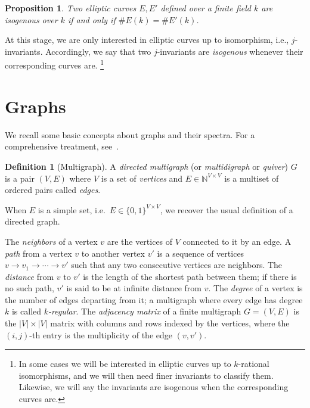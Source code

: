 \documentclass[10pt]{article}
\theoremstyle{plain}
\newtheorem{proposition}[theorem]{Proposition}
\theoremstyle{definition}
\newtheorem{definition}[theorem]{Definition}
\begin{document}
\begin{proposition}
  \label{coro:serre-tate}
  Two elliptic curves $E,E'$ defined over a finite field $k$ are
  isogenous over $k$ if and only if $\#E(k)=\#E'(k)$.
\end{proposition}

At this stage, we are only interested in elliptic curves up to
isomorphism, i.e., $j$-invariants. %
Accordingly, we say that two $j$-invariants are \emph{isogenous}
whenever their corresponding curves are.%
\footnote{In some cases we will be interested in elliptic curves up to
  $k$-rational isomorphisms, and we will then need finer invariants to
  classify them. %
  Likewise, we will say the invariants are isogenous when the
  corresponding curves are.}


\section{Graphs}
\label{sec:graphs}

We recall some basic concepts about graphs and their spectra. %
For a comprehensive treatment,
see~\cite{trevisan-graphs,tao2011expander,Goldreich2011}.

\begin{definition}[Multigraph]
  A \emph{directed multigraph} (or \emph{multidigraph} or \emph{quiver})
  $G$ is a pair $(V,E)$ where $V$ is a set of \emph{vertices} and
  $E∈ℕ^{V×V}$ is a multiset of ordered pairs called \emph{edges}.   
\end{definition}

When $E$ is a simple set, i.e.\ $E∈\{0,1\}^{V×V}$, we recover the
usual definition of a directed graph. %

The \emph{neighbors} of a vertex $v$ are the vertices of $V$ connected
to it by an edge. %
A \emph{path} from a vertex $v$ to another vertex $v'$ is a sequence
of vertices $v\to v_1\to\cdots\to v'$ such that any two consecutive
vertices are neighbors. %
The \emph{distance} from $v$ to $v'$ is the length of the shortest
path between them; if there is no such path, $v'$ is said to be at
infinite distance from $v$. %
The \emph{degree} of a vertex is the number of edges departing from
it; a multigraph where every edge has degree $k$ is called
\emph{$k$-regular}. %
The \emph{adjacency matrix} of a finite multigraph $G=(V,E)$ is the
$|V|×|V|$ matrix with columns and rows indexed by the vertices, where
the $(i,j)$-th entry is the multiplicity of the edge $(v,v')$.
\end{document}
